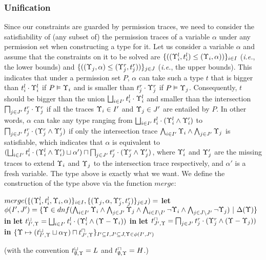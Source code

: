 {{{\subsubsection{\textbf{Unification}}
Since our constraints are guarded by permission traces, we need to consider the satisfiability of (any subset of) the permission traces of a variable $\alpha$ under any permission set when constructing a type for it.
Let us consider a variable $\alpha$ and assume that the constraints on it to be solved are
 $\{((\Upsilon_i^l,t_i^l)\leq(\Upsilon_i,\alpha))\}_{i\in I}$ (\emph{i.e.}, the lower bounds) and
  $\{((\Upsilon_j,\alpha)\leq(\Upsilon_j^r,t_j^r))\}_{j\in J}$ (\emph{i.e.}, the upper bounds).
This indicates that under a permission set $P$, $\alpha$ can take such a type $t$ that is bigger than $t_i^l\cdot\Upsilon_i^l$ if $P\vDash \Upsilon_i$ and is smaller than $t_j^r\cdot\Upsilon_j^r$ if $P\vDash \Upsilon_j$.
Consequently, $t$ should be bigger than the union $\bigsqcup_{i\in I'} t_i^l\cdot\Upsilon_i^l$ and smaller than the intersection $\bigsqcap_{j\in J'} t_j^r\cdot\Upsilon_j^r$ if all the traces $\Upsilon_i \in I'$ and $\Upsilon_j \in J'$ are entailed by $P$.
In other words, $\alpha$ can take any type ranging from $\bigsqcup_{i\in I'} t_i^l\cdot(\Upsilon_i^l\wedge \Upsilon'_i)$ to $\bigsqcap_{j\in J'} t_j^r\cdot(\Upsilon_j^r\wedge\Upsilon'_j)$ if only the intersection trace $\bigwedge_{i \in I'} \Upsilon_i \wedge \bigwedge_{j\in J'}\Upsilon_j$ is satisfiable, which indicates that $\alpha$ is equivalent to $(\bigsqcup_{i\in I'} t_i^l\cdot(\Upsilon_i^l\wedge \Upsilon'_i) \sqcup \alpha' )\sqcap \bigsqcap_{j\in J'} t_j^r\cdot(\Upsilon_j^r\wedge \Upsilon'_j)$, where $\Upsilon'_i$ and $\Upsilon'_j$ are the missing traces to extend  $\Upsilon_i$ and $\Upsilon_j$ to the intersection trace respectively, and $\alpha'$ is a fresh variable.
The type above is exactly what we want.
We define the construction of the type above via the function $merge$:
{
\begin{algorithmic}
\STATE $merge(\{({\Upsilon_i^l},{t_i^l},{\Upsilon_i},{\alpha})\}_{i\in I},\{({\Upsilon_j},{\alpha},{\Upsilon_j^r},{t_j^r})\}_{j\in J})=$
\STATE \quad \textbf{let} $\phi(I',J') = \{\Upsilon\in dnf(\bigwedge_{i \in I'} \Upsilon_i \wedge \bigwedge_{j\in J'}\Upsilon_j\wedge \bigwedge_{i \in I\setminus I'} \neg \Upsilon_i \wedge \bigwedge_{j\in J\setminus J'}\neg \Upsilon_j) ~|~ \Delta(\Upsilon)\}$ \textbf{in}
\STATE  \quad \textbf{let} $t_{I',\Upsilon}^{\sqcup} =\bigsqcup_{i\in I'} t_i^l\cdot(\Upsilon_i^l\wedge (\Upsilon-\Upsilon_i))$ \textbf{in}
\STATE  \quad \textbf{let} $t_{J',\Upsilon}^{\sqcap} =\bigsqcap_{j\in J'} t_j^r\cdot(\Upsilon_j^r\wedge (\Upsilon-\Upsilon_j))$ \textbf{in}
\STATE  \quad $\{\Upsilon \mapsto (t_{I',\Upsilon}^{\sqcup} \sqcup \alpha_{\Upsilon})\sqcap t_{J',\Upsilon}^{\sqcap} \}_{I'\subseteq I, J'\subseteq J, \Upsilon \in \phi(I',J')}$
\end{algorithmic}
(with the convention $t_{\emptyset,\Upsilon}^{\sqcup} = L$ and $t_{\emptyset,\Upsilon}^{\sqcap} = H$.)
}

}}}
